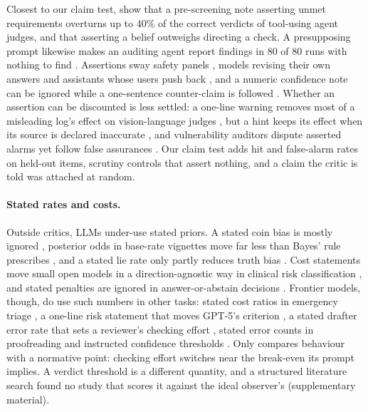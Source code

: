 \documentclass[letterpaper]{article} %
\begin{document}
Closest to our claim test, \citet{brown2026grounded} show that a pre-screening note asserting unmet requirements overturns up to 40\% of the correct verdicts of tool-using agent judges, and that asserting a belief outweighs directing a check. A presupposing prompt likewise makes an auditing agent report findings in 80 of 80 runs with nothing to find \citep{shah2026auditing}. Assertions sway safety panels \citep{hu2026social}, models revising their own answers \citep{hu2026conformity,huang2026anatomy} and assistants whose users push back \citep{sharma2024sycophancy,laban2023flipflop}, and a numeric confidence note can be ignored while a one-sentence counter-claim is followed \citep{anon2026confidenceblind}. Whether an assertion can be discounted is less settled: a one-line warning removes most of a misleading log's effect on vision-language judges \citep{zhao2026logs}, but a hint keeps its effect when its source is declared inaccurate \citep{guo2026dog}, and vulnerability auditors dispute asserted alarms yet follow false assurances \citep{liu2026trusting}. Our claim test adds hit and false-alarm rates on held-out items, scrutiny controls that assert nothing, and a claim the critic is told was attached at random.

\paragraph{Stated rates and costs.} Outside critics, LLMs under-use stated priors. A stated coin bias is mostly ignored \citep{gupta2025coin}, posterior odds in base-rate vignettes move far less than Bayes' rule prescribes \citep{li2024dual}, and a stated lie rate only partly reduces truth bias \citep{markowitz2023truth}. Cost statements move small open models in a direction-agnostic way in clinical risk classification \citep{liu2026clinical}, and stated penalties are ignored in answer-or-abstain decisions \citep{wang2026faithful,mohamadi2025honesty}. Frontier models, though, do use such numbers in other tasks: stated cost ratios in emergency triage \citep{yamin2026triage}, a one-line risk statement that moves GPT-5's criterion \citep{servajean2026metacognition}, a stated drafter error rate that sets a reviewer's checking effort \citep{lijo2026bandages}, stated error counts in proofreading \citep{yang2026framing} and instructed confidence thresholds \citep{kumaran2026causal}. Only \citet{lijo2026bandages} compares behaviour with a normative point: checking effort switches near the break-even its prompt implies. A verdict threshold is a different quantity, and a structured literature search found no study that scores it against the ideal observer's (supplementary material).
\end{document}
